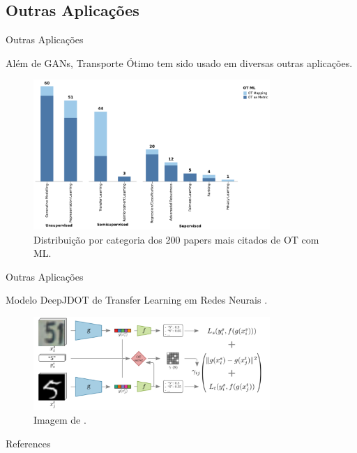 \documentclass[10pt]{beamer}
\begin{document}
\subsection{Outras Aplicações}
\begin{frame}[fragile]{Outras Aplicações}

	Além de GANs, Transporte Ótimo tem sido usado
	em diversas outras aplicações.

	\begin{figure}[H]
		\begin{center}
			\includegraphics[width=0.8\textwidth]{Figures/categories_papers_2}
		\end{center}
		\caption{Distribuição por categoria dos 200 papers mais citados de OT com ML\citep{sales2021optimal}.}
	\end{figure}

\end{frame}

\begin{frame}[fragile]{Outras Aplicações}

	Modelo DeepJDOT de Transfer Learning em Redes Neurais \citep{damodaran2018deepjdot}.

	\vspace{3mm}
	\begin{figure}[H]
		\begin{center}
			\includegraphics[width=0.8\textwidth]{Figures/deepjdot.png}
		\end{center}
		\caption{Imagem de \citet{damodaran2018deepjdot}.}
	\end{figure}

\end{frame}

\begin{frame}[allowframebreaks]{References}
	\nocite{*}

	\renewcommand{\section}[2]{}%
	\tiny{}
	
\end{frame}
\end{document}
